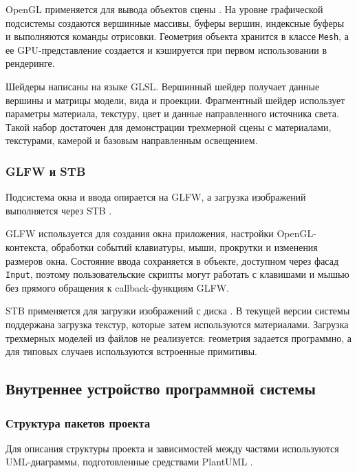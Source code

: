 OpenGL применяется для вывода объектов сцены \cite{khronos-opengl,opengl-spec-33,opengl-wiki,opengl-programming-guide,opengl-superbible}. На уровне графической
подсистемы создаются вершинные массивы, буферы вершин, индексные буферы и
выполняются команды отрисовки. Геометрия объекта хранится в классе
\texttt{Mesh}, а ее GPU-представление создается и кэшируется при первом
использовании в рендеринге.

Шейдеры написаны на языке GLSL. Вершинный шейдер получает данные вершины
и матрицы модели, вида и проекции. Фрагментный шейдер использует параметры
материала, текстуру, цвет и данные направленного источника света. Такой набор
достаточен для демонстрации трехмерной сцены с материалами, текстурами,
камерой и базовым направленным освещением.

\subsubsection{GLFW и STB}

Подсистема окна и ввода опирается на GLFW, а загрузка изображений выполняется
через STB \cite{glfw-docs,stb}.

GLFW используется для создания окна приложения, настройки OpenGL-контекста,
обработки событий клавиатуры, мыши, прокрутки и изменения размеров окна.
Состояние ввода сохраняется в объекте, доступном через фасад \texttt{Input},
поэтому пользовательские скрипты могут работать с клавишами и мышью без
прямого обращения к callback-функциям GLFW.

STB применяется для загрузки изображений с диска \cite{stb}. В текущей версии системы
поддержана загрузка текстур, которые затем используются материалами. Загрузка
трехмерных моделей из файлов не реализуется: геометрия задается программно,
а для типовых случаев используются встроенные примитивы.

\subsection{Внутреннее устройство программной системы}

\subsubsection{Структура пакетов проекта}

Для описания структуры проекта и зависимостей между частями используются
UML-диаграммы, подготовленные средствами PlantUML \cite{uml-spec,plantuml}.

